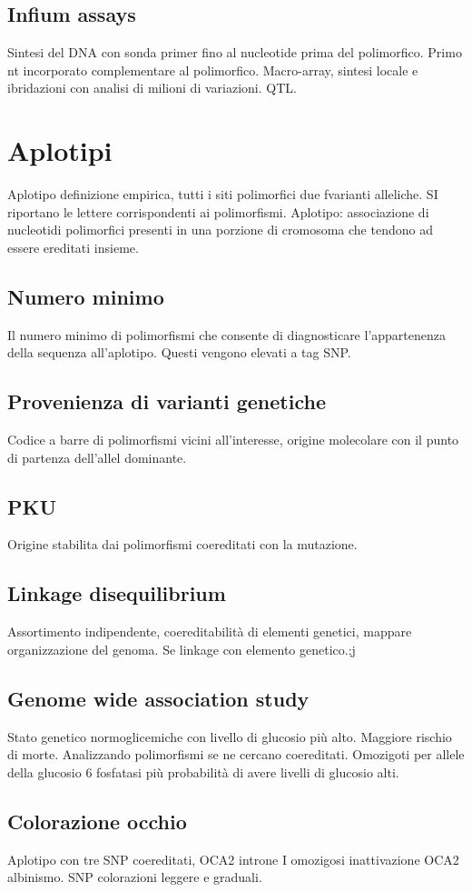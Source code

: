 	\subsection{Infium assays}
	Sintesi del DNA con sonda primer fino al nucleotide prima del polimorfico.
	Primo nt incorporato complementare al polimorfico.
	Macro-array, sintesi locale e ibridazioni con analisi di milioni di variazioni.
	QTL.

\section{Aplotipi}
Aplotipo definizione empirica, tutti i siti polimorfici due fvarianti alleliche.
SI riportano le lettere corrispondenti ai polimorfismi.
Aplotipo: associazione di nucleotidi polimorfici presenti in una porzione di cromosoma che tendono ad essere ereditati insieme.

	\subsection{Numero minimo}
	Il numero minimo di polimorfismi che consente di diagnosticare l'appartenenza della sequenza all'aplotipo.
	Questi vengono elevati a tag SNP.

	\subsection{Provenienza di varianti genetiche}
	Codice a barre di polimorfismi vicini all'interesse, origine molecolare con il punto di partenza dell'allel dominante.

	\subsection{PKU}
	Origine stabilita dai polimorfismi coereditati con la mutazione.

	\subsection{Linkage disequilibrium}
	Assortimento indipendente, coereditabilit\`a di elementi genetici, mappare organizzazione del genoma.
	Se linkage con elemento genetico.;j

	\subsection{Genome wide association study}
	Stato genetico normoglicemiche con livello di glucosio pi\`u alto.
	Maggiore rischio di morte.
	Analizzando polimorfismi se ne cercano coereditati.
	Omozigoti per allele della glucosio 6 fosfatasi pi\`u probabilit\`a di avere livelli di glucosio alti.

	\subsection{Colorazione occhio}
	Aplotipo con tre SNP coereditati, OCA2 introne I omozigosi inattivazione OCA2 albinismo.
	SNP colorazioni leggere e graduali.
